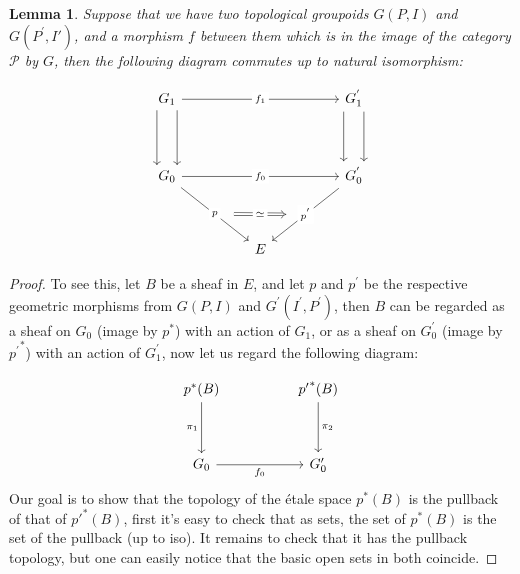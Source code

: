 \documentclass[10pt,a4paper]{amsart}
\newtheorem{lemma}[theorem]{Lemma}
\newtheorem*{Notation Convention*}{Notation Convention}
\newcommand{\ca}[1]{\mathcal{#1}}
\begin{document}
\setcounter{section}{7}
\setcounter{equation}{0}
\setcounter{corollary}{0}
\setcounter{note}{0}
\setcounter{theorem}{8}
\begin{lemma} Suppose that we have two topological groupoids $G(P,I)$ and $G(P^{'},I')$, and a morphism $f$ between them which is in the image of the category $\ca{P}$ by $G$, then the following diagram commutes up to natural isomorphism:


\[
\begin{tikzcd}
	{G_1} &&&& {G^{'}_1} \\
	\\
	{G_0} &&&& {G^{'}_0} \\
	\\
	&& E
	\arrow["{f_1}"{description}, from=1-1, to=1-5]
	\arrow[shift right=3, from=1-1, to=3-1]
	\arrow[shift left=3, from=1-1, to=3-1]
	\arrow[shift left=3, from=1-5, to=3-5]
	\arrow[shift right=3, from=1-5, to=3-5]
	\arrow["{f_0}"{description}, from=3-1, to=3-5]
	\arrow[""{name=0, anchor=center, inner sep=0}, "p"{description}, from=3-1, to=5-3]
	\arrow[""{name=1, anchor=center, inner sep=0}, "{p^{'}}"{description}, from=3-5, to=5-3]
	\arrow["\simeq"{description}, shorten <=13pt, shorten >=13pt, Rightarrow, from=0, to=1]
\end{tikzcd}
\]


\end{lemma}

\setcounter{section}{7}
\setcounter{equation}{0}
\setcounter{corollary}{0}
\setcounter{note}{0}
\setcounter{theorem}{9}
\begin{proof}
    

To see this, let $B$ be a sheaf in $E$, and let $p$ and $p^{'}$ be the respective geometric morphisms from  $G(P,I)$ and $G^{'}(I^{'},P^{'})$, then $B$ can be regarded as a sheaf on $G_0$ (image by $p^*$) with an action of $G_1$, or as a sheaf on $G^{'}_0$ (image by ${p^{'}}^*$) with an action of $G^{'}_1$, now let us regard the following diagram: 

\[\begin{tikzcd}
	{{p^{*}(B)} } && {{{p'}^{*}(B)}} \\
	\\
	{G_0} && {G'_0}
	\arrow["{\pi_1}"', from=1-1, to=3-1]
	\arrow["{\pi_2}", from=1-3, to=3-3]
	\arrow["{f_0}"', from=3-1, to=3-3]
\end{tikzcd}\]
Our goal is to show that the topology of the étale space $p^*(B)$ is the pullback of that of ${p'}^*(B)$, first it's easy to check that as sets, the set  of $p^*(B)$  is the set of the pullback (up to iso). It remains to check that it has the pullback topology, but one can easily notice that the basic open sets in both coincide.

\end{proof}
\end{document}
